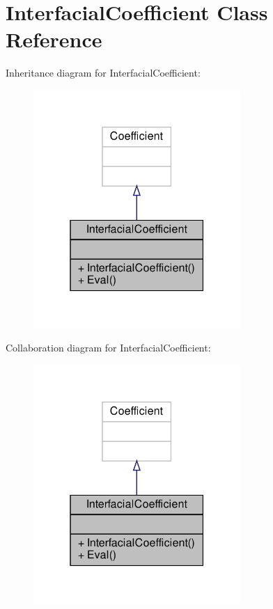 \hypertarget{classInterfacialCoefficient}{}\section{Interfacial\+Coefficient Class Reference}
\label{classInterfacialCoefficient}


Inheritance diagram for Interfacial\+Coefficient\+:\nopagebreak
\begin{figure}[H]
\begin{center}
\leavevmode
\includegraphics[width=223pt]{classInterfacialCoefficient__inherit__graph}
\end{center}
\end{figure}


Collaboration diagram for Interfacial\+Coefficient\+:\nopagebreak
\begin{figure}[H]
\begin{center}
\leavevmode
\includegraphics[width=223pt]{classInterfacialCoefficient__coll__graph}
\end{center}
\end{figure}
